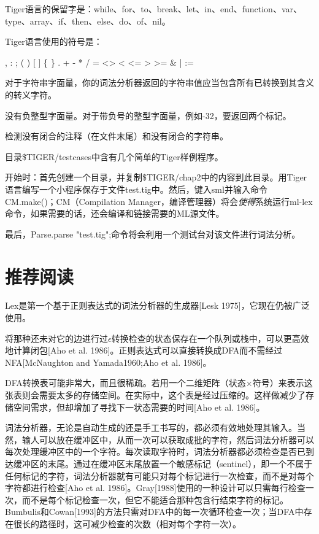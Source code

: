 \documentclass[cn,11pt,chinese]{elegantbook}
\begin{document}
Tiger语言的保留字是：while、for、to、break、let、in、end、function、var、type、array、if、then、else、do、of、nil。

Tiger语言使用的符号是：

, : ; ( ) [ ] \{ \} . + - * / = <> < <= > >= \& | :=

对于字符串字面量，你的词法分析器返回的字符串值应当包含所有已转换到其含义的转义字符。

没有负整型字面量。对于带负号的整型字面量，例如-32，要返回两个标记。

检测没有闭合的注释（在文件末尾）和没有闭合的字符串。

目录\$TIGER/testcases中含有几个简单的Tiger样例程序。

开始时：首先创建一个目录，并复制\$TIGER/chap2中的内容到此目录。用Tiger语言编写一个小程序保存于文件test.tig中。然后，键入sml并输入命令CM.make()；CM（Compilation Manager，编译管理器）将会\textit{使得}系统运行ml-lex命令，如果需要的话，还会编译和链接需要的ML源文件。

最后，Parse.parse "test.tig";命令将会利用一个测试台对该文件进行词法分析。

\section{推荐阅读}

Lex是第一个基于正则表达式的词法分析器的生成器[Lesk 1975]，它现在仍被广泛使用。

将那种还未对它的边进行过$\epsilon$转换检查的状态保存在一个队列或栈中，可以更高效地计算闭包[Aho et al. 1986]。正则表达式可以直接转换成DFA而不需经过NFA[McNaughton and Yamada1960;Aho et al. 1986]。

DFA转换表可能非常大，而且很稀疏。若用一个二维矩阵（状态$\times$符号）来表示这张表则会需要太多的存储空间。在实际中，这个表是经过压缩的。这样做减少了存储空间需求，但却增加了寻找下一状态需要的时间[Aho et al. 1986]。

词法分析器，无论是自动生成的还是手工书写的，都必须有效地处理其输入。当然，输人可以放在缓冲区中，从而一次可以获取成批的字符，然后词法分析器可以每次处理缓冲区中的一个字符。每次读取字符时，词法分析器都必须检查是否已到达缓冲区的末尾。通过在缓冲区末尾放置一个敏感标记（sentinel），即一个不属于任何标记的字符，词法分析器就有可能只对每个标记进行一次检查，而不是对每个字符都进行检查[Aho et al. 1986]。Gray[1988]使用的一种设计可以只需每行检查一次，而不是每个标记检查一次，但它不能适合那种包含行结束字符的标记。Bumbulis和Cowan[1993]的方法只需对DFA中的每一次循环检查一次；当DFA中存在很长的路径时，这可减少检查的次数（相对每个字符一次）。
\end{document}

